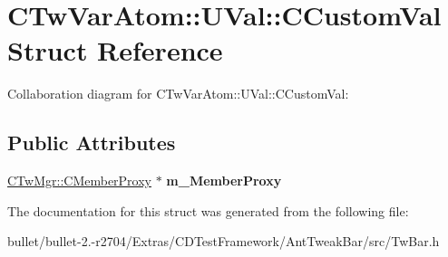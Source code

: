 \hypertarget{struct_c_tw_var_atom_1_1_u_val_1_1_c_custom_val}{\section{C\+Tw\+Var\+Atom\+:\+:U\+Val\+:\+:C\+Custom\+Val Struct Reference}
\label{struct_c_tw_var_atom_1_1_u_val_1_1_c_custom_val}
}


Collaboration diagram for C\+Tw\+Var\+Atom\+:\+:U\+Val\+:\+:C\+Custom\+Val\+:
\subsection*{Public Attributes}
\begin{DoxyCompactItemize}
\item 
\hypertarget{struct_c_tw_var_atom_1_1_u_val_1_1_c_custom_val_a59f5c3a3d02b290a824f3a43ef07580b}{\hyperlink{struct_c_tw_mgr_1_1_c_member_proxy}{C\+Tw\+Mgr\+::\+C\+Member\+Proxy} $\ast$ {\bfseries m\+\_\+\+Member\+Proxy}}\label{struct_c_tw_var_atom_1_1_u_val_1_1_c_custom_val_a59f5c3a3d02b290a824f3a43ef07580b}

\end{DoxyCompactItemize}


The documentation for this struct was generated from the following file\+:\begin{DoxyCompactItemize}
\item 
bullet/bullet-\/2.-\/r2704/\+Extras/\+C\+D\+Test\+Framework/\+Ant\+Tweak\+Bar/src/Tw\+Bar.\+h\end{DoxyCompactItemize}
